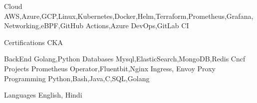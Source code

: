 

\begin{cvskills}

  \cvskill
    {Cloud} %
	{AWS,Azure,GCP,Linux,Kubernetes,Docker,Helm,Terraform,Prometheus,Grafana,Networking,eBPF,GitHub Actions,Azure DevOps,GitLab CI} %

  \cvskill
    {Certifications} %
	{CKA} %

  \cvskill
   {BackEnd} %
	{Golang,Python} %
  \cvskill
   {Databases} %
	{Mysql,ElasticSearch,MongoDB,Redis} %
\cvskill
{Cncf Projects} %
{Prometheus Operator,Fluentbit,Nginx Ingress, Envoy Proxy} %
  \cvskill
   {Programming} %
	{Python,Bash,Java,C,SQL,Golang} %

  \cvskill
    {Languages} %
	{English, Hindi} %

\end{cvskills}
